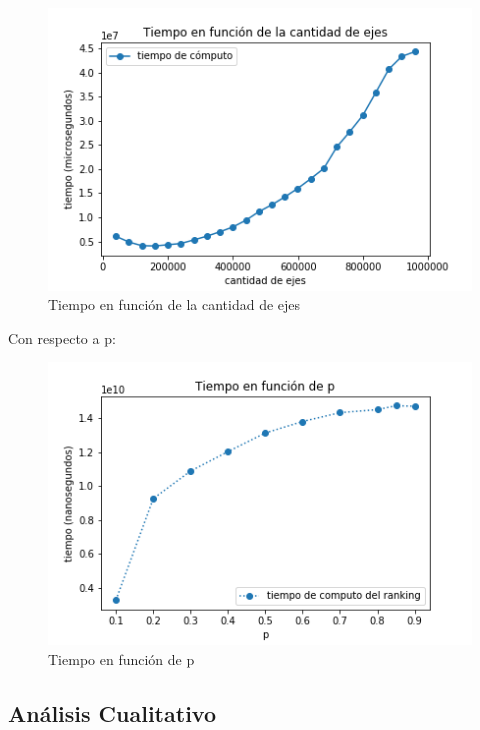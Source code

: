 \begin{figure}
   \begin{center}
     \includegraphics{img/tiempo_ejes_solo.png} 
  \end{center}
\caption{Tiempo en función de la cantidad de ejes} \label{fig:exp1-ejes}
\end{figure}



Con respecto a p:

\begin{figure}
   \begin{center}
     \includegraphics{img/tiempo_p.png} 
  \end{center}
\caption{Tiempo en función de p} \label{fig:exp1-p}
\end{figure}



\newpage

\subsection{Análisis Cualitativo}

